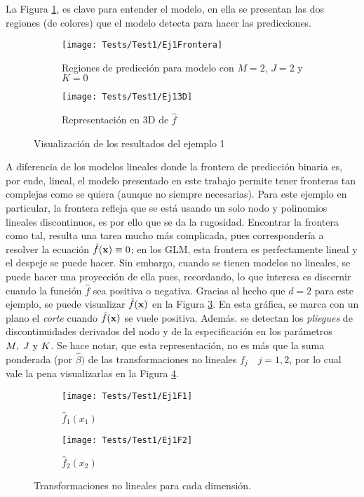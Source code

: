 \documentclass[../Main/Main.tex]{subfiles}
\begin{document}
La Figura \ref{fig:Test1Ej1}, es clave para entender el modelo, en ella se presentan las dos regiones (de colores) que el modelo detecta para hacer las predicciones.
\begin{figure}[h]
	\centering
	\begin{subfigure}[b]{0.45\textwidth}
    	\texttt{[image: Tests/Test1/Ej1Frontera]}
		\caption{Regiones de predicción para modelo con $M = 2$, $J = 2$ y $K = 0$}
	\label{fig:Test1Ej1}
	\end{subfigure}
	\hfill    
    \begin{subfigure}[b]{0.45\textwidth}
        \texttt{[image: Tests/Test1/Ej13D]}
        \caption{Representación en 3D de $\hat{f}$}
        \label{fig:Test1Ej13D}
    \end{subfigure}
    \caption{Visualización de los resultados del ejemplo 1}
\end{figure}
A diferencia de los modelos lineales donde la frontera de predicción binaria es, por ende, lineal, el modelo presentado en este trabajo permite tener fronteras tan complejas como se quiera (aunque no siempre necesarias). Para este ejemplo en particular, la frontera refleja que se está usando un solo nodo y polinomios lineales discontinuos, es por ello que se da la rugosidad. Encontrar la frontera como tal, resulta una tarea mucho más complicada, pues correspondería a resolver la ecuación  $\hat{f}(\mathbf{x}) \equiv 0$; en los GLM, esta frontera es perfectamente lineal y el despeje se puede hacer. Sin embargo, cuando se tienen modelos no lineales, se puede hacer una proyección de ella pues, recordando, lo que interesa es discernir cuando la función $\hat{f}$ sea positiva o negativa. Gracias al hecho que $d = 2$ para este ejemplo, se puede visualizar $\hat{f}(\mathbf{x})$ en la Figura \ref{fig:Test1Ej13D}. En esta gráfica, se marca con un plano el \textit{corte} cuando $\hat{f}(\mathbf{x})$ se vuele positiva. Además. se detectan los \textit{pliegues} de discontinuidades derivados del nodo y de la especificación en los parámetros $M,\;J\text{ y }K$. Se hace notar, que esta representación, no es más que la suma ponderada (por $\hat{\beta})$ de las transformaciones no lineales $f_j \quad j=1,2$, por lo cual vale la pena visualizarlas en la Figura \ref{fig:Test1Ej1Fs}. 
\begin{figure}[h]
    \begin{subfigure}[b]{0.45\textwidth}
        \texttt{[image: Tests/Test1/Ej1F1]}
        \caption{$\hat{f}_1(x_1)$}
    \end{subfigure}
	\hfill
	    \begin{subfigure}[b]{0.45\textwidth}
        \texttt{[image: Tests/Test1/Ej1F2]}
        \caption{$\hat{f}_2(x_2)$}
    \end{subfigure}
    \caption{Transformaciones no lineales para cada dimensión.}\label{fig:Test1Ej1Fs}
\end{figure}
\end{document}
